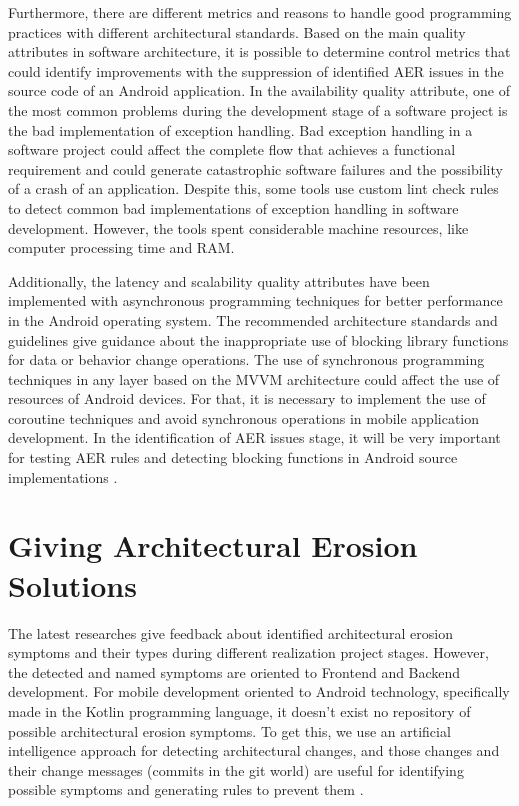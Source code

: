Furthermore, there are different metrics and reasons to handle good programming practices with different architectural standards. Based on the main quality attributes in software architecture, it is possible to determine control metrics that could identify improvements with the suppression of identified AER issues in the source code of an Android application.
In the availability quality attribute, one of the most common problems during the development stage of a software project is the bad implementation of exception handling. Bad exception handling in a software project could affect the complete flow that achieves a functional requirement and could generate catastrophic software failures and the possibility of a crash of an application. Despite this, some tools use custom lint check rules to detect common bad implementations of exception handling in software development. However, the tools spent considerable machine resources, like computer processing time and RAM. \cite{handle-exceptions-references}

Additionally, the latency and scalability quality attributes have been implemented with asynchronous programming techniques for better performance in the Android operating system. The recommended architecture standards and guidelines give guidance about the inappropriate use of blocking library functions for data or behavior change operations. The use of synchronous programming techniques in any layer based on the MVVM architecture could affect the use of resources of Android devices. For that, it is necessary to implement the use of coroutine techniques and avoid synchronous operations in mobile application development. In the identification of AER issues stage, it will be very important for testing AER rules and detecting blocking functions in Android source implementations \cite{performance-coroutines-reference}.


\section{Giving Architectural Erosion Solutions}
The latest researches give feedback about identified architectural erosion symptoms and their types during different realization project stages. However, the detected and named symptoms are oriented to Frontend and Backend development. For mobile development oriented to Android technology, specifically made in the Kotlin programming language, it doesn't exist no repository of possible architectural erosion symptoms. To get this, we use an artificial intelligence approach for detecting architectural changes, and those changes and their change messages (commits in the git world) are useful for identifying possible symptoms and generating rules to prevent them \cite{aer-metrics-paper}.


